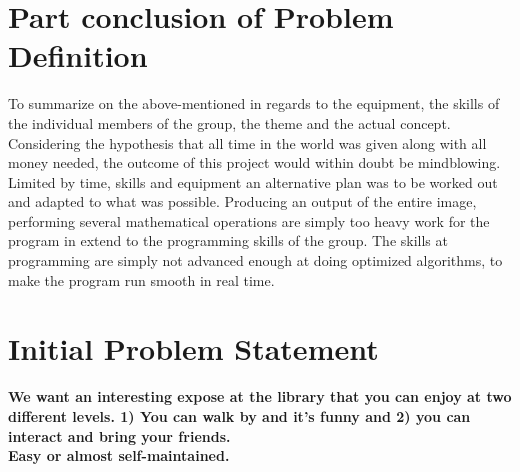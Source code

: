 \section{Part conclusion of Problem Definition}
To summarize on the above-mentioned in regards to the equipment, the skills of the individual members of the group, the theme and the actual concept.\\
Considering the hypothesis that all time in the world was given along with all money needed, the outcome of this project would within doubt be mindblowing. Limited by time, skills and equipment an alternative plan was to be worked out and adapted to what was possible. Producing an output of the entire image, performing several mathematical operations are simply too heavy work for the program in extend to the programming skills of the group. The skills at programming are simply not advanced enough at doing optimized algorithms, to make the program run smooth in real time.      

\section{Initial Problem Statement}
 

      
\textbf{We want an interesting expose at the library that you can enjoy at two different levels. 1) You can walk by and it's funny and 2) you can interact and bring your friends.}\\
\textbf{Easy or almost self-maintained.}











